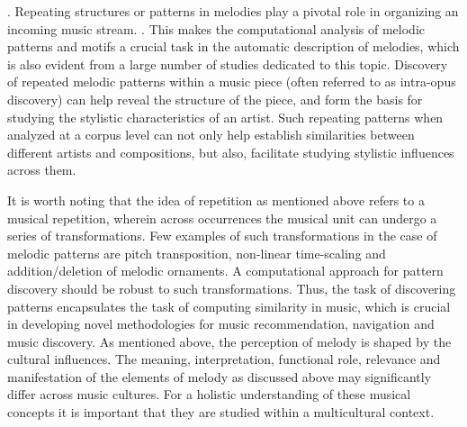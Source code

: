 . Repeating structures or patterns in melodies play a pivotal role in organizing an incoming music stream. . This makes the computational analysis of melodic patterns and motifs a crucial task in the automatic description of melodies, which is also evident from a large number of studies dedicated to this topic. Discovery of repeated melodic patterns within a music piece (often referred to as intra-opus discovery) can help reveal the structure of the piece, and form the basis for studying the stylistic characteristics of an artist. Such repeating patterns when analyzed at a corpus level can not only help establish similarities between different artists and compositions, but also, facilitate studying stylistic influences across them. 


It is worth noting that the idea of repetition as mentioned above refers to a musical repetition, wherein across occurrences the musical unit can undergo a series of transformations. Few examples of such transformations in the case of melodic patterns are pitch transposition, non-linear time-scaling and addition/deletion of melodic ornaments. A computational approach for pattern discovery should be robust to such transformations. Thus, the task of discovering patterns encapsulates the task of computing similarity in music, which is crucial in developing novel methodologies for music recommendation, navigation and music discovery. As mentioned above, the perception of melody is shaped by the cultural influences. The meaning, interpretation, functional role, relevance and manifestation of the elements of melody as discussed above may significantly differ across music cultures.  For a holistic understanding of these musical concepts it is important that they are studied within a multicultural context.

